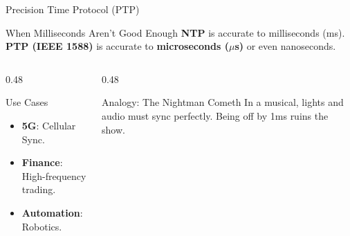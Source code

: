 \documentclass[aspectratio=169]{beamer}  %
\begin{document}
\begin{frame}{Precision Time Protocol (PTP)}
    \begin{block}{When Milliseconds Aren't Good Enough}
        \small
        \textbf{NTP} is accurate to milliseconds (ms). \textbf{PTP (IEEE 1588)} is accurate to \textbf{microseconds ($\mu$s)} or even nanoseconds.
    \end{block}
    \vspace{0.3cm}
    \begin{columns}[T]
        \begin{column}{0.48\textwidth}
            \begin{block}{Use Cases}
                \small
                \begin{itemize}
                    \item \textbf{5G}: Cellular Sync.
                    \item \textbf{Finance}: High-frequency trading.
                    \item \textbf{Automation}: Robotics.
                \end{itemize}
            \end{block}
        \end{column}
        \begin{column}{0.48\textwidth}
            \begin{alertblock}{Analogy: The Nightman Cometh}
                \small
                In a musical, lights and audio must sync perfectly. Being off by 1ms ruins the show.
            \end{alertblock}
            \begin{center}
            \end{center}
        \end{column}
    \end{columns}
\end{frame}
\end{document}
